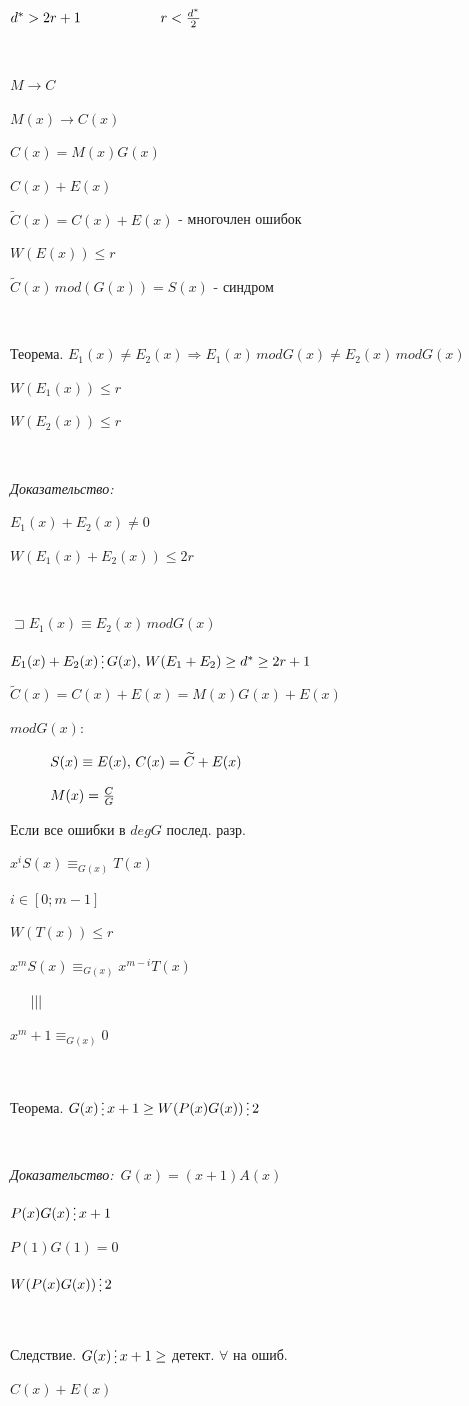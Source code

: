 \documentclass[12pt]{article}
\begin{document}
$d^* > 2r+1 \hspace{2 cm} r < \frac{d^*}{2}$\par
$ $\par
$M \to C$\par
$M(x) \to C(x)$\par
$C(x) = M(x)G(x)$\par
$C(x)+E(x)$\par
$\widetilde{C}(x)= C(x)+E(x)$ - многочлен ошибок\par
\textit{$W(E(x)) \leq r$}\par
$\widetilde{C}(x) \, mod(G(x))=S(x)$ - синдром \par
$ $\par
Теорема. $E_1(x) \neq E_2(x) \Rightarrow E_1(x) \, mod G(x) \neq E_2(x) \, mod G(x)$\par
$W(E_1(x)) \leq r$\par
$W(E_2(x)) \leq r$\par
$ $\par
\textit{Доказательство:}\par
$E_1(x) + E_2(x) \neq 0$\par
$W(E_1(x)+E_2(x)) \leq 2r$\par
$ $\par
$\sqsupset E_1(x) \equiv E_2(x) \, mod G(x)$\par
$E_1(x)+E_2(x) \mathop{\raisebox{-2pt}{\vdots}} G(x), \, W(E_1+E_2) \geq d^* \geq 2r+1$\par
$\widetilde{C}(x)=C(x)+E(x) = M(x)G(x)+E(x)$\par
$mod G(x):$\par
$\hspace{1 cm} S(x) \equiv E(x), \, C(x) = \widetilde{C}+E(x)$\par
$\hspace{1 cm} M(x) = \frac{C}{G}$\par
Если все ошибки в $deg G$ послед.  разр.\par
$x^i S(x) \equiv_{G(x)}T(x)$\par
$i \in [0;m-1]$\par
$W(T(x)) \leq r$\par
$x^mS(x) \equiv_{G(x)} x^{m-i}T(x)$\par
$\hspace{5 mm} |||$\par
$x^m+1 \equiv_{G(x)}0$\par
$ $\par
Теорема. $G(x) \mathop{\raisebox{-2pt}{\vdots}} x+1 \geq W(P(x)G(x)) \mathop{\raisebox{-2pt}{\vdots}} 2$\par
$ $\par
\textit{Доказательство:} $\, G(x) = (x+1)A(x)$\par
$P(x)G(x) \mathop{\raisebox{-2pt}{\vdots}} x+1$\par
$P(1)G(1) = 0$\par
$W(P(x)G(x)) \mathop{\raisebox{-2pt}{\vdots}} 2$\par
$ $\par
Следствие. $G(x) \mathop{\raisebox{-2pt}{\vdots}} x+1 \geq$ детект. $\forall$ на ошиб.\par
$C(x)+E(x)$\par
\end{document}
